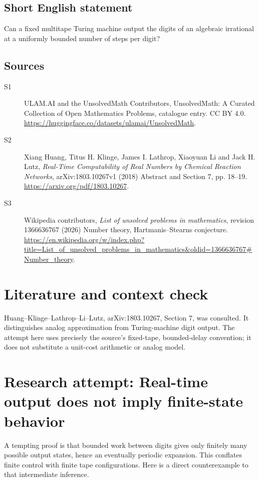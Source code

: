 \documentclass[11pt]{article}
\begin{document}
\subsection{Short English statement}
Can a fixed multitape Turing machine output the digits of an algebraic irrational at a uniformly bounded number of steps per digit?
\subsection{Sources}
\begin{description}
\item[S1] ULAM.AI and the UnsolvedMath Contributors, UnsolvedMath: A Curated Collection of Open Mathematics Problems, catalogue entry. CC BY 4.0. \url{https://huggingface.co/datasets/ulamai/UnsolvedMath}.
\item[S2] Xiang Huang, Titus H. Klinge, James I. Lathrop, Xiaoyuan Li and Jack H. Lutz, \emph{Real-Time Computability of Real Numbers by Chemical Reaction Networks}, arXiv:1803.10267v1 (2018) Abstract and Section 7, pp. 18--19. \url{https://arxiv.org/pdf/1803.10267}.
\item[S3] Wikipedia contributors, \emph{List of unsolved problems in mathematics}, revision 1366636767 (2026) Number theory, Hartmanis–Stearns conjecture. \url{https://en.wikipedia.org/w/index.php?title=List_of_unsolved_problems_in_mathematics&oldid=1366636767#Number_theory}.
\end{description}
\label{end:statement}

\section{Literature and context check}
Huang--Klinge--Lathrop--Li--Lutz, arXiv:1803.10267, Section 7, was consulted.
It distinguishes analog approximation from Turing-machine digit output. The
attempt here uses precisely the source's fixed-tape, bounded-delay convention;
it does not substitute a unit-cost arithmetic or analog model.
\section{Research attempt: Real-time output does not imply finite-state behavior}
A tempting proof is that bounded work between digits gives only finitely many
possible output states, hence an eventually periodic expansion. This conflates
finite control with finite tape configurations. Here is a direct counterexample
to that intermediate inference.
\end{document}
